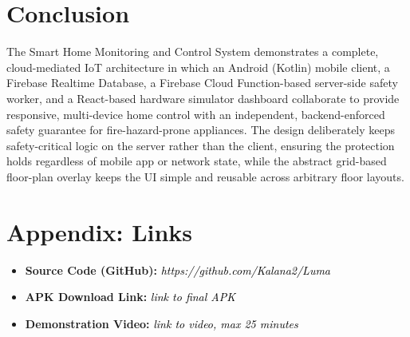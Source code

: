\documentclass[11pt,a4paper]{article}
\newcommand{\todofill}[1]{\textcolor{black}{\textit{#1}}}
\begin{document}
\newpage
\section{Conclusion}

The Smart Home Monitoring and Control System demonstrates a complete, cloud-mediated IoT architecture in which an Android (Kotlin) mobile client, a Firebase Realtime Database, a Firebase Cloud Function-based server-side safety worker, and a React-based hardware simulator dashboard collaborate to provide responsive, multi-device home control with an independent, backend-enforced safety guarantee for fire-hazard-prone appliances. The design deliberately keeps safety-critical logic on the server rather than the client, ensuring the protection holds regardless of mobile app or network state, while the abstract grid-based floor-plan overlay keeps the UI simple and reusable across arbitrary floor layouts.

\vspace{1cm}
\section*{Appendix: Links}
\begin{itemize}
    \item \textbf{Source Code (GitHub):} \todofill{https://github.com/Kalana2/Luma}
    \item \textbf{APK Download Link:} \todofill{link to final APK}
    \item \textbf{Demonstration Video:} \todofill{link to video, max 25 minutes}
\end{itemize}
\end{document}
